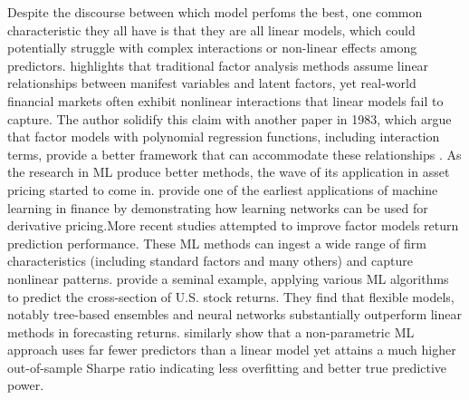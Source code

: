 Despite the discourse between which model perfoms the best, one common characteristic they all have is that they are all linear models, which could potentially struggle with complex interactions or non-linear effects among predictors.  highlights that traditional factor analysis methods assume linear relationships between manifest variables and latent factors, yet real-world financial markets often exhibit nonlinear interactions that linear models fail to capture. The author solidify this claim with another paper in 1983, which argue that factor models with polynomial regression functions, including interaction terms, provide a better framework that can accommodate these relationships \cite{mcdonald_1983}. As the research in ML produce better methods, the wave of its application in asset pricing started to come in.   provide one of the earliest applications of machine learning in finance by demonstrating how learning networks can be used for derivative pricing.More recent studies attempted to improve factor models return prediction performance. These ML methods can ingest a wide range of firm characteristics (including standard factors and many others) and capture nonlinear patterns.  provide a seminal example, applying various ML algorithms to predict the cross-section of U.S. stock returns. They find that flexible models, notably tree-based ensembles and neural networks substantially outperform linear methods in forecasting returns.  similarly show that a non-parametric ML approach uses far fewer predictors than a linear model yet attains a much higher out-of-sample Sharpe ratio indicating less overfitting and better true predictive power.

